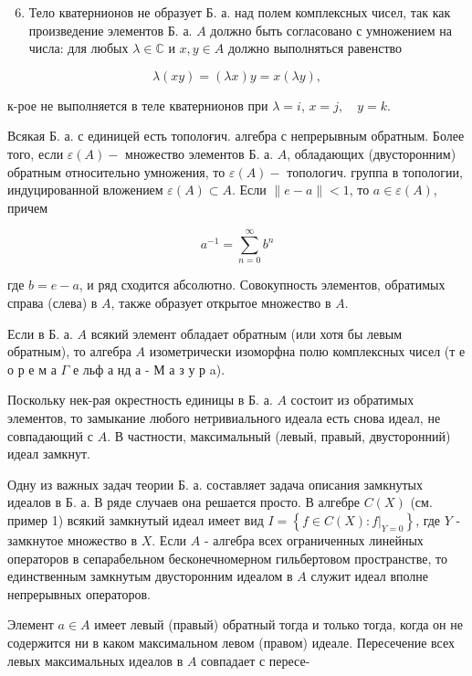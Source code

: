 \documentclass[10pt]{article}
\begin{document}
\begin{enumerate}

  \setcounter{enumi}{5}

  \item Тело кватернионов не образует Б. а. над полем комплексных чисел, так как произведение элементов Б. а. $A$ должно быть согласовано с умножением на числа: для любых $\lambda \in \mathbb{C}$ и $x, y \in A$ должно выполняться равенство

\end{enumerate}



\[

\lambda(x y)=(\lambda x) y=x(\lambda y),

\]



к-рое не выполняется в теле кватернионов при $\lambda=i$, $x=j, \quad y=k$.



Всякая Б. а. с единицей есть тополоғич. алгебра с непрерывным обратным. Более того, если $\varepsilon(A)-$ множество элементов Б. а. $A$, обладающих (двусторонним) обратным относительно умножения, то $\varepsilon(A)-$ топологич. группа в топологии, индуцированной вложением $\varepsilon(A) \subset A$. Если $\|e-a\|<1$, то $a \in \varepsilon(A)$, причем



\[

a^{-1}=\sum_{n=0}^{\infty} b^{n}

\]



где $b=e-a$, и ряд сходится абсолютно. Совокупность элементов, обратимых справа (слева) в $A$, также образует открытое множество в $A$.



Если в Б. а. $A$ всякий элемент обладает обратным (или хотя бы левым обратным), то алгебра $A$ изометрически изоморфна полю комплексных чисел (т е о р е м а $\Gamma$ е льф а нд а - М а з у р a).



Поскольку нек-рая окрестность единицы в Б. а. $A$ состоит из обратимых элементов, то замыкание любого нетривиального идеала есть снова идеал, не совпадающий с $A$. В частности, максимальный (левый, правый, двусторонний) идеал замкнут.



Одну из важных задач теории Б. а. составляет задача описания замкнутых идеалов в Б. а. В ряде случаев она решается просто. В алгебре $C(X)$ (см. пример 1) всякий замкнутый идеал имеет вид $I=\left\{f \in C(X):\left.f\right|_{Y=0}\right\}$, где $Y$ - замкнутое множество в $X$. Если $A$ - алгебра всех ограниченных линейных операторов в сепарабельном бесконечномерном гильбертовом пространстве, то единственным замкнутым двусторонним идеалом в $A$ служит идеал вполне непрерывных операторов.



Элемент $a \in A$ имеет левый (правый) обратный тогда и только тогда, когда он не содержится ни в каком максимальном левом (правом) идеале. Пересечение всех левых максимальных идеалов в $A$ совпадает с пересе-
\end{document}

